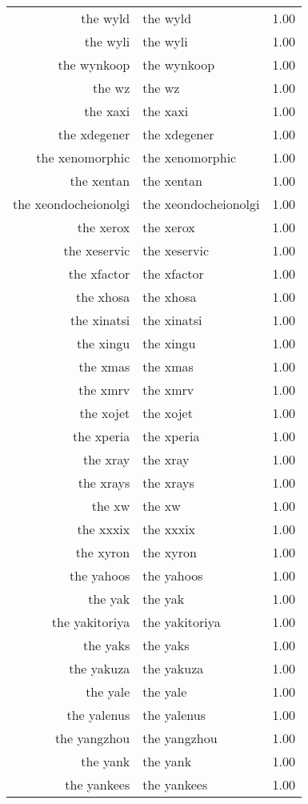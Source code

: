 \begin{table}[ht]
\begin{tabular}{rlr}
  the wyld & the wyld & 1.00 \\ 
  the wyli & the wyli & 1.00 \\ 
  the wynkoop & the wynkoop & 1.00 \\ 
  the wz & the wz & 1.00 \\ 
  the xaxi & the xaxi & 1.00 \\ 
  the xdegener & the xdegener & 1.00 \\ 
  the xenomorphic & the xenomorphic & 1.00 \\ 
  the xentan & the xentan & 1.00 \\ 
  the xeondocheionolgi & the xeondocheionolgi & 1.00 \\ 
  the xerox & the xerox & 1.00 \\ 
  the xeservic & the xeservic & 1.00 \\ 
  the xfactor & the xfactor & 1.00 \\ 
  the xhosa & the xhosa & 1.00 \\ 
  the xinatsi & the xinatsi & 1.00 \\ 
  the xingu & the xingu & 1.00 \\ 
  the xmas & the xmas & 1.00 \\ 
  the xmrv & the xmrv & 1.00 \\ 
  the xojet & the xojet & 1.00 \\ 
  the xperia & the xperia & 1.00 \\ 
  the xray & the xray & 1.00 \\ 
  the xrays & the xrays & 1.00 \\ 
  the xw & the xw & 1.00 \\ 
  the xxxix & the xxxix & 1.00 \\ 
  the xyron & the xyron & 1.00 \\ 
  the yahoos & the yahoos & 1.00 \\ 
  the yak & the yak & 1.00 \\ 
  the yakitoriya & the yakitoriya & 1.00 \\ 
  the yaks & the yaks & 1.00 \\ 
  the yakuza & the yakuza & 1.00 \\ 
  the yale & the yale & 1.00 \\ 
  the yalenus & the yalenus & 1.00 \\ 
  the yangzhou & the yangzhou & 1.00 \\ 
  the yank & the yank & 1.00 \\ 
  the yankees & the yankees & 1.00 \\ 

\end{tabular}
\end{table}
